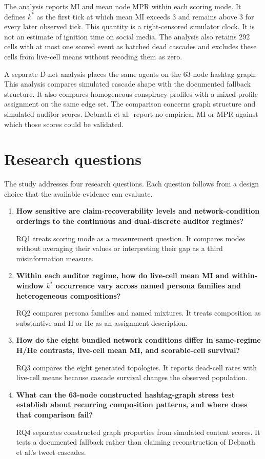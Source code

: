 The analysis reports MI and mean node MPR within each scoring mode.
It defines \(k^{*}\) as the first tick at which mean MI exceeds 3 and remains above 3 for every later observed tick.
This quantity is a right-censored simulator clock.
It is not an estimate of ignition time on social media.
The analysis also retains 292 cells with at most one scored event as hatched dead cascades and excludes these cells from live-cell means without recoding them as zero.

A separate D-net analysis places the same agents on the 63-node hashtag graph.
This analysis compares simulated cascade shape with the documented fallback structure.
It also compares homogeneous conspiracy profiles with a mixed profile assignment on the same edge set.
The comparison concerns graph structure and simulated auditor scores.
Debnath et al.\ report no empirical MI or MPR against which those scores could be validated.

\section{Research questions}
\label{sec:introduction_rqs}

The study addresses four research questions.
Each question follows from a design choice that the available evidence can evaluate.

\begin{enumerate}
    \item[\textbf{RQ1}] \textbf{How sensitive are claim-recoverability levels and network-condition orderings to the continuous and dual-discrete auditor regimes?}

    RQ1 treats scoring mode as a measurement question.
    It compares modes without averaging their values or interpreting their gap as a third misinformation measure.

    \item[\textbf{RQ2}] \textbf{Within each auditor regime, how do live-cell mean MI and within-window \(k^{*}\) occurrence vary across named persona families and heterogeneous compositions?}

    RQ2 compares persona families and named mixtures.
    It treats composition as substantive and H or He as an assignment description.

    \item[\textbf{RQ3}] \textbf{How do the eight bundled network conditions differ in same-regime H/He contrasts, live-cell mean MI, and scorable-cell survival?}

    RQ3 compares the eight generated topologies.
    It reports dead-cell rates with live-cell means because cascade survival changes the observed population.

    \item[\textbf{RQ4}] \textbf{What can the 63-node constructed hashtag-graph stress test establish about recurring composition patterns, and where does that comparison fail?}

    RQ4 separates constructed graph properties from simulated content scores.
    It tests a documented fallback rather than claiming reconstruction of Debnath et al.'s tweet cascades.
\end{enumerate}

